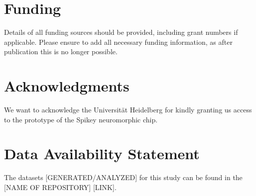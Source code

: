 \documentclass[utf8]{frontiersFPHY} %
\begin{document}
\section*{Funding}
Details of all funding sources should be provided, including grant numbers if applicable. Please ensure to add all necessary funding information, as after publication this is no longer possible.

\section*{Acknowledgments}
We want to acknowledge the Universit\"at Heidelberg for kindly granting us access to the prototype of the Spikey neuromorphic chip.


\section*{Data Availability Statement}
The datasets [GENERATED/ANALYZED] for this study can be found in the [NAME OF REPOSITORY] [LINK].




\end{document}
